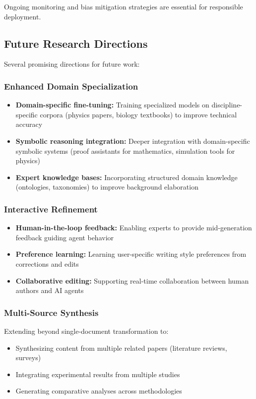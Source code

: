 \documentclass{ieeeaccess}
\begin{document}
Ongoing monitoring and bias mitigation strategies are essential for responsible deployment.

\subsection{Future Research Directions}

Several promising directions for future work:

\subsubsection{Enhanced Domain Specialization}

\begin{itemize}
\item \textbf{Domain-specific fine-tuning:} Training specialized models on discipline-specific corpora (physics papers, biology textbooks) to improve technical accuracy
\item \textbf{Symbolic reasoning integration:} Deeper integration with domain-specific symbolic systems (proof assistants for mathematics, simulation tools for physics)
\item \textbf{Expert knowledge bases:} Incorporating structured domain knowledge (ontologies, taxonomies) to improve background elaboration
\end{itemize}

\subsubsection{Interactive Refinement}

\begin{itemize}
\item \textbf{Human-in-the-loop feedback:} Enabling experts to provide mid-generation feedback guiding agent behavior
\item \textbf{Preference learning:} Learning user-specific writing style preferences from corrections and edits
\item \textbf{Collaborative editing:} Supporting real-time collaboration between human authors and AI agents
\end{itemize}

\subsubsection{Multi-Source Synthesis}

Extending beyond single-document transformation to:
\begin{itemize}
\item Synthesizing content from multiple related papers (literature reviews, surveys)
\item Integrating experimental results from multiple studies
\item Generating comparative analyses across methodologies
\end{itemize}
\end{document}
